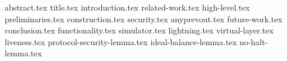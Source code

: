 \documentclass[format=sigconf, anonymous=false]{acmart}
\begin{document}
\pagestyle{plain}

{abstract.tex}
{title.tex}
{introduction.tex}
{related-work.tex}
{high-level.tex}
{preliminaries.tex}
{construction.tex}
{security.tex}
{anyprevout.tex}
{future-work.tex}
{conclusion.tex}
\appendix
{functionality.tex}
{simulator.tex}
{lightning.tex}
{virtual-layer.tex}
{liveness.tex}
{protocol-security-lemma.tex}
{ideal-balance-lemma.tex}
{no-halt-lemma.tex}


\end{document}
